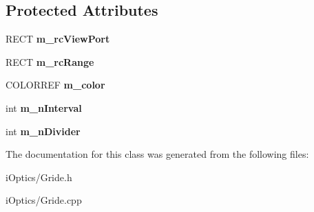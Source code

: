 \subsection*{Protected Attributes}
\begin{DoxyCompactItemize}
\item 
\mbox{\label{class_gride_a7ea4a4f620430655d7a2580d17ab5018}} 
R\+E\+CT {\bfseries m\+\_\+rc\+View\+Port}
\item 
\mbox{\label{class_gride_a6c665805c7bccae37782bc91ccabf03e}} 
R\+E\+CT {\bfseries m\+\_\+rc\+Range}
\item 
\mbox{\label{class_gride_a0ab3e516224b88c29fe59883ed8ba132}} 
C\+O\+L\+O\+R\+R\+EF {\bfseries m\+\_\+color}
\item 
\mbox{\label{class_gride_afc79ddb62399c63257357a2f380d7509}} 
int {\bfseries m\+\_\+n\+Interval}
\item 
\mbox{\label{class_gride_a0d95020c7d18231961a105f97e124953}} 
int {\bfseries m\+\_\+n\+Divider}
\end{DoxyCompactItemize}


The documentation for this class was generated from the following files\+:\begin{DoxyCompactItemize}
\item 
i\+Optics/Gride.\+h\item 
i\+Optics/Gride.\+cpp\end{DoxyCompactItemize}
